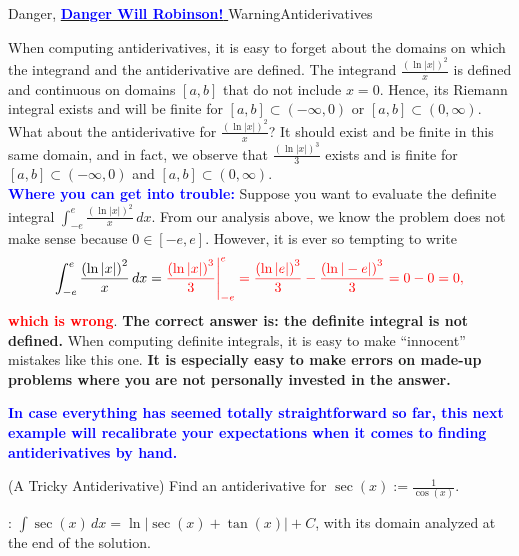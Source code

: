 \bigskip 
\begin{factColor}{Danger, \href{https://cultural-phenomenons.fandom.com/wiki/Danger,_Will_Robinson}{ \textcolor{blue}{\bf Danger Will Robinson!} }}{WarningAntiderivatives}

When computing antiderivatives, it is easy to forget about the domains on which the integrand and the antiderivative are defined.  The integrand $\frac{\left( \ln|x| \right)^2}{x}$ is defined and continuous on domains $[a, b]$ that do not include $x=0$. Hence, its Riemann integral exists and will be finite for $[a, b] \subset (-\infty, 0)$ or $[a, b] \subset (0, \infty)$. What about the antiderivative for $\frac{\left( \ln|x| \right)^2}{x}$? It should exist and be finite in this same domain, and in fact, we observe that $\frac{\left(\ln|x| \right)^3}{3}$ exists and is finite for $[a, b] \subset (-\infty, 0)$ and $[a, b] \subset (0, \infty)$.\\

\textcolor{blue}{\bf Where you can get into trouble:} Suppose you want to evaluate the definite integral $\int_{-e}^e \frac{\left( \ln|x| \right)^2}{x} \, dx$. From our analysis above, we know the problem does not make sense because $0 \in [-e, e]$. However, it is ever so tempting to write
 $$ \int_{-e}^e \frac{\left( \ln|x| \right)^2}{x} \, dx = \color{red} \frac{\left(\ln|x| \right)^3}{3} \Bigg|_{-e}^e = \frac{\left(\ln|e| \right)^3}{3} - \frac{\left(\ln|-e| \right)^3}{3} = 0 - 0 = 0,$$
 \textcolor{red}{\bf which is wrong}. \textbf{The correct answer is: the definite integral is not defined.} When computing definite integrals, it is easy to make ``innocent'' mistakes like this one. \textbf{It is especially easy to make errors on made-up problems where you are not personally invested in the answer.} 
    
\end{factColor}


\bigskip
\textcolor{blue}{\bf In case everything has seemed totally straightforward so far, this next example will recalibrate your expectations when it comes to finding antiderivatives by hand.}

\begin{example} 
\label{ex:TrickySecant}
(A Tricky Antiderivative) Find an antiderivative for $\sec(x):=\frac{1}{\cos(x)}$.
    
\end{example}

\solution \Ans: $\int \sec(x) \, dx =  \ln|\sec(x) + \tan(x)| + C$, with its domain analyzed at the end of the solution.\\


